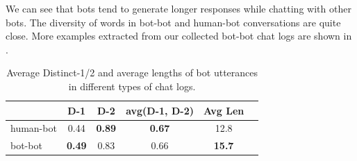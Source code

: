 We can see that bots tend to generate longer 
responses while chatting with other bots. 
The diversity of words in bot-bot and human-bot conversations
 are quite close.
More examples extracted from our collected
bot-bot chat logs are shown in .

\begin{table}[th]
\small
\centering
\begin{tabular}{lccccc}
\toprule
& D-1 & D-2 & avg(D-1, D-2)&Avg Len\\ \midrule
human-bot & 0.44  & \textbf{0.89}   &\textbf{0.67}  &12.8 \\ \midrule
bot-bot & \textbf{0.49}  &0.83    &0.66 &\textbf{15.7} \\ \bottomrule
\end{tabular}
\caption{Average Distinct-1/2 and average lengths of 
bot utterances in different types of chat logs. }
\label{tab:div}
\end{table}


